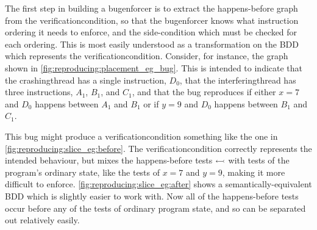 \begin{wrapfigure}{O}{5.2cm}
  \begin{mdframed}
  \caption{}
  \label{fig:reproducing:placement_eg_bug}
  \end{mdframed}
\end{wrapfigure}
The first step in building a \gls{bugenforcer} is to extract the
happens-before graph from the \gls{verificationcondition}, so that the
\gls{bugenforcer} knows what instruction ordering it needs to enforce,
and the side-condition which must be checked for each ordering.  This
is most easily understood as a transformation on the BDD which
represents the \gls{verificationcondition}.  Consider, for instance,
the graph shown in \autoref{fig:reproducing:placement_eg_bug}.  This
is intended to indicate that the \gls{crashingthread} has a single
instruction, $D_0$, that the \gls{interferingthread} has three
instructions, $A_1$, $B_1$, and $C_1$, and that the bug reproduces if
either $x = 7$ and $D_0$ happens between $A_1$ and $B_1$ or if $y = 9$
and $D_0$ happens between $B_1$ and $C_1$.

This bug might produce a \gls{verificationcondition} something like
the one in \autoref{fig:reproducing:slice_eg:before}.  The
\gls{verificationcondition} correctly represents the intended
behaviour, but mixes the happens-before tests $\leftarrowtail$
with tests of the program's ordinary state, like the tests of $x = 7$
and $y = 9$, making it more difficult to enforce.
\autoref{fig:reproducing:slice_eg:after} shows a
semantically-equivalent BDD which is slightly easier to work with.
Now all of the happens-before tests occur before any of the tests of
ordinary program state, and so can be separated out relatively easily.

